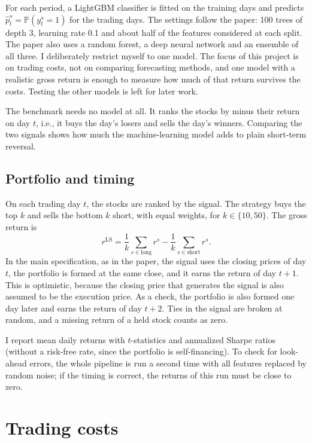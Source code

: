 \documentclass[11pt,a4paper]{article}
\theoremstyle{definition}
\theoremstyle{remark}
\begin{document}
For each period, a LightGBM classifier is fitted on the training days and
predicts $\hat p^s_t = \mathbb{P}(y^s_t = 1)$ for the trading days. The
settings follow the paper: 100 trees of depth 3, learning rate 0.1 and about
half of the features considered at each split. The paper also uses a random
forest, a deep neural network and an ensemble of all three. I deliberately
restrict myself to one model. The focus of this project is on trading costs,
not on comparing forecasting methods, and one model with a realistic gross
return is enough to measure how much of that return survives the costs.
Testing the other models is left for later work.

The benchmark needs no model at all. It ranks the stocks by minus their return
on day $t$, i.e., it buys the day's losers and sells the day's winners.
Comparing the two signals shows how much the machine-learning model adds to
plain short-term reversal.

\subsection{Portfolio and timing}

On each trading day $t$, the stocks are ranked by the signal. The strategy buys
the top $k$ and sells the bottom $k$ short, with equal weights, for
$k \in \{10, 50\}$. The gross return is
\[
  r^{\text{LS}} = \frac{1}{k} \sum_{s \in \text{long}} r^s - \frac{1}{k} \sum_{s \in \text{short}} r^s .
\]
In the main specification, as in the paper, the signal uses the closing prices
of day $t$, the portfolio is formed at the same close, and it earns the return
of day $t+1$. This is optimistic, because the closing price that generates the
signal is also assumed to be the execution price. As a check, the portfolio is
also formed one day later and earns the return of day $t+2$. Ties in the signal
are broken at random, and a missing return of a held stock counts as zero.

I report mean daily returns with $t$-statistics and annualized Sharpe ratios
(without a risk-free rate, since the portfolio is self-financing). To check for
look-ahead errors, the whole pipeline is run a second time with all features
replaced by random noise; if the timing is correct, the returns of this run
must be close to zero.


\section{Trading costs}
\end{document}
